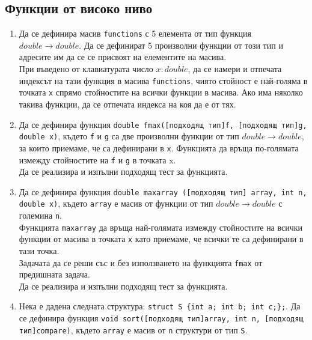 {\begin{enumerate}
\end{enumerate}

\pagebreak
\subsection {Функции от високо ниво}

\begin{enumerate}[resume]  


	\item Да се дефинира масив \texttt{functions} с 5 елемента от тип функция $double \rightarrow double$. Да се дефинират 5 произволни функции от този тип и адресите им да се се присвоят на елементите на масива.\\

	При въведено от клавиатурата число $x:double$, да се намери и отпечата индексът на тази функция в масива \texttt{functions}, чиято стойност е най-голяма в точката \texttt{x} спрямо стойностите на всички функции в масива. Ако има няколко такива функции, да се отпечата индекса на коя да е от тях.

	\item Да се дефинира функция \texttt{double fmax([подходящ тип]f, [подходящ тип]g, double x)}, където \texttt{f} и \texttt{g} са две произволни функции от тип $double \rightarrow double$, за които приемаме, че са дефинирани в \texttt{x}.  Функцията да връща по-голямата измежду стойностите на \texttt{f} и \texttt{g} в точката x.\\

	Да се реализира и изпълни подходящ тест за функцията.

	\item Да се дефинира функция \texttt{double maxarray ([подходящ тип] array, int n, double x)}, където \texttt{array} е масив от функции от тип $double \rightarrow double$ с големина \texttt{n}. \\

	Функцията \texttt{maxarray} да връща най-голямата измежду стойностите на всички функции от масива в точката \texttt{x} като приемаме, че всички те са дефинирани в тази точка.\\

	Задачата да се реши със и без използването на функцията \texttt{fmax} от предишната задача.\\

	Да се реализира и изпълни подходящ тест за функцията.

	\item Нека е дадена следната структура: \texttt{struct S \{int a; int b; int c;\};}. Да се дефинира функция \texttt{void sort([подходящ тип]array, int n, [подходящ тип]compare)}, където \texttt{array} е масив от \texttt{n} структури от тип \texttt{S}.\\


\end{enumerate}}
